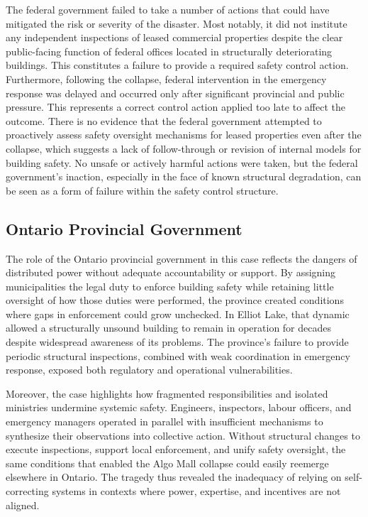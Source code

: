 \documentclass[12pt]{article}
\begin{document}
The federal government failed to take a number of actions that could have mitigated the risk or severity of the disaster. Most notably, it did not institute any independent inspections of leased commercial properties despite the clear public-facing function of federal offices located in structurally deteriorating buildings. This constitutes a failure to provide a required safety control action. Furthermore, following the collapse, federal intervention in the emergency response was delayed and occurred only after significant provincial and public pressure. This represents a correct control action applied too late to affect the outcome. There is no evidence that the federal government attempted to proactively assess safety oversight mechanisms for leased properties even after the collapse, which suggests a lack of follow-through or revision of internal models for building safety. No unsafe or actively harmful actions were taken, but the federal government's inaction, especially in the face of known structural degradation, can be seen as a form of failure within the safety control structure.

\subsection{Ontario Provincial Government}

The role of the Ontario provincial government in this case reflects the dangers of distributed power without adequate accountability or support. By assigning municipalities the legal duty to enforce building safety while retaining little oversight of how those duties were performed, the province created conditions where gaps in enforcement could grow unchecked. In Elliot Lake, that dynamic allowed a structurally unsound building to remain in operation for decades despite widespread awareness of its problems. The province's failure to provide periodic structural inspections, combined with weak coordination in emergency response, exposed both regulatory and operational vulnerabilities.

Moreover, the case highlights how fragmented responsibilities and isolated ministries undermine systemic safety. Engineers, inspectors, labour officers, and emergency managers operated in parallel with insufficient mechanisms to synthesize their observations into collective action. Without structural changes to execute inspections, support local enforcement, and unify safety oversight, the same conditions that enabled the Algo Mall collapse could easily reemerge elsewhere in Ontario. The tragedy thus revealed the inadequacy of relying on self-correcting systems in contexts where power, expertise, and incentives are not aligned.
\end{document}
